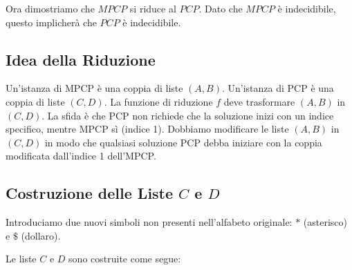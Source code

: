 \documentclass[a4paper]{article}
\theoremstyle{definition} %
\theoremstyle{remark} %
\begin{document}
Ora dimostriamo che $MPCP$ si riduce al $PCP$. Dato che $MPCP$ è indecidibile, questo implicherà che $PCP$ è indecidibile.

\subsection{Idea della Riduzione}
Un'istanza di MPCP è una coppia di liste $(A, B)$. Un'istanza di PCP è una coppia di liste $(C, D)$.
La funzione di riduzione $f$ deve trasformare $(A, B)$ in $(C, D)$.
La sfida è che PCP non richiede che la soluzione inizi con un indice specifico, mentre MPCP sì (indice 1). Dobbiamo modificare le liste $(A, B)$ in $(C, D)$ in modo che qualsiasi soluzione PCP debba iniziare con la coppia modificata dall'indice 1 dell'MPCP.

\subsection{Costruzione delle Liste $C$ e $D$}
Introduciamo due nuovi simboli non presenti nell'alfabeto originale: $*$ (asterisco) e $\$$ (dollaro).

Le liste $C$ e $D$ sono costruite come segue:
\end{document}
